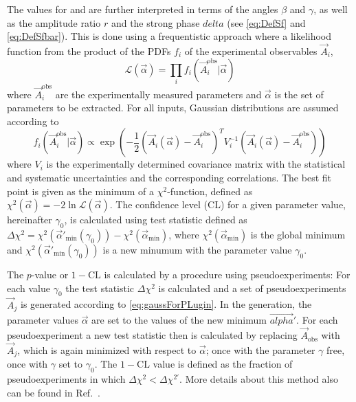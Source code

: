 The values for \Sf and \Sfbar are further interpreted in terms of the angles $\beta$ and $\gamma$, as well as the amplitude ratio $r$ and the strong phase $delta$ (see \cref{eq:DefSf} and \eqref{eq:DefSfbar}).
This is done using a frequentistic approach where a likelihood function from the product of the PDFs $f_i$ of the experimental observables $\vec{A}_i$,
\begin{equation}
\mathcal{L}(\vec{\alpha})=\prod_i f_i\left(\vec{A}_i^{\text{obs}}\big|\vec{\alpha}\right)
\end{equation}
where $\vec{A}_i^{\text{obs}}$ are the experimentally measured parameters and $\vec{\alpha}$ is the set of parameters to be extracted.
For all inputs, Gaussian distributions are assumed according to
\begin{equation}
f_i\left(\vec{A}_i^{\text{obs}}\big|\vec{\alpha}\right)\propto\exp\!\left(-\frac{1}{2}\left(\vec{A}_i(\vec{\alpha})-\vec{A}_i^{\text{obs}}\right)^T V_i^{-1}\left(\vec{A}_i(\vec{\alpha})-\vec{A}_i^{\text{obs}}\right)\right)\label{eq:gaussForPLugin}
\end{equation}
where $V_i$ is the experimentally determined covariance matrix with the statistical and systematic uncertainties and the corresponding correlations.
The best fit point is given as the minimum of a $\chi^2$-function, defined as $\chi^2(\vec{\alpha})=-2\ln\mathcal{L}(\vec{\alpha})$.
The confidence level (CL) for a given parameter value, hereinafter $\gamma_0$, is calculated using test statistic defined as $\Delta\chi^2=\chi^2(\vec{\alpha}'_{\text{min}}(\gamma_0))-\chi^2(\vec{\alpha}_{\text{min}})$, where $\chi^2(\vec{\alpha}_{\text{min}})$ is the global minimum and $\chi^2(\vec{\alpha}'_{\text{min}}(\gamma_0))$ is a new minumum with the parameter value $\gamma_0$.

The $p$-value or $1-\text{CL}$ is calculated by a procedure using pseudoexperiments:
For each value $\gamma_0$ the test statistic $\Delta\chi^2$ is calculated and a set of pseudoexperiments $\vec{A}_j$ is generated according to \cref{eq:gaussForPLugin}.
In the generation, the parameter values $\vec{\alpha}$ are set to the values of the new minimum $\vec{alpha}'$.
For each pseudoexperiment a new test statistic then is calculated by replacing $\vec{A}_{\text{obs}}$ with $\vec{A}_j$, which is again minimized with respect to $\vec{\alpha}$; once with the parameter $\gamma$ free, once with $\gamma$ set to $\gamma_0$.
The $1-\text{CL}$ value is defined as the fraction of pseudoexperiments in which $\Delta\chi^2<\Delta\chi^{2'}$.
More details about this method also can be found in Ref.~\cite{Bodhisattva:2009uba}.

